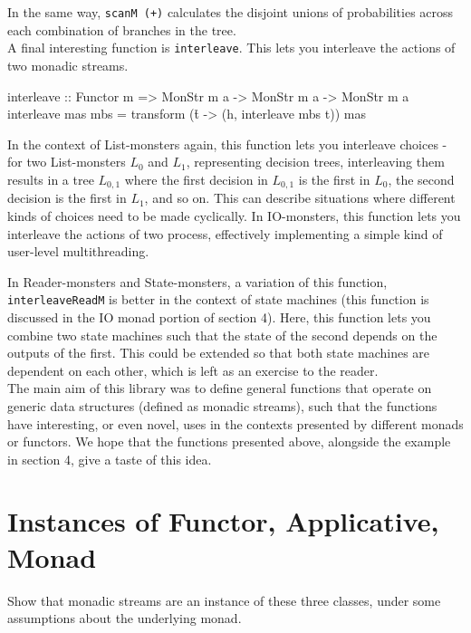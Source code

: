 \documentclass{article}
\begin{document}
In the same way, \verb=scanM (+)= calculates the disjoint unions of probabilities across each combination of branches in the tree. \\

A final interesting function is \verb+interleave+. This lets you interleave the actions of two monadic streams. 

\begin{haskell}
interleave :: Functor m =>  MonStr m a -> MonStr m a -> MonStr m a
interleave mas mbs = transform (\h t -> (h, interleave mbs t)) mas
\end{haskell}

In the context of List-monsters again, this function lets you interleave choices - for two List-monsters $L_0$ and $L_1$, representing decision trees, interleaving them results in a tree $L_{0,1}$ where the first decision in $L_{0,1}$ is the first in $L_0$, the second decision is the first in $L_1$, and so on. This can describe situations where different kinds of choices need to be made cyclically. In IO-monsters, this function lets you interleave the actions of two process, effectively implementing a simple kind of user-level multithreading. 

In Reader-monsters and State-monsters, a variation of this function, \newline \verb+interleaveReadM+ is better in the context of state machines (this function is discussed in the IO monad portion of section 4). Here, this function lets you combine two state machines such that the state of the second depends on the outputs of the first. This could be extended so that both state machines are dependent on each other, which is left as an exercise to the reader. \\

The main aim of this library was to define general functions that operate on generic data structures (defined as monadic streams), such that the functions have interesting, or even novel, uses in the contexts presented by different monads or functors. We hope that the functions presented above, alongside the example in section 4, give a taste of this idea.


\section{Instances of Functor, Applicative, Monad}

Show that monadic streams are an instance of these three classes, under some assumptions about the underlying monad.
\end{document}

